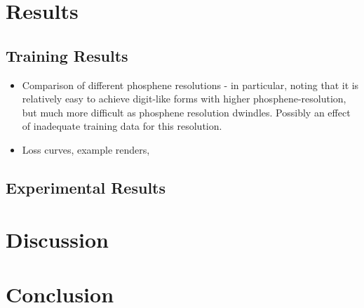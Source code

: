\documentclass[12pt]{book}
\begin{document}
\chapter{Results}

\section{Training Results}

\begin{itemize}
    \item Comparison of different phosphene resolutions - in particular, noting that it is relatively easy to achieve digit-like forms with higher phosphene-resolution, but much more difficult as phosphene resolution dwindles. Possibly an effect of inadequate training data for this resolution.
    \item Loss curves, example renders,
\end{itemize}

\section{Experimental Results}

\chapter{Discussion}

\chapter{Conclusion}
\end{document}
